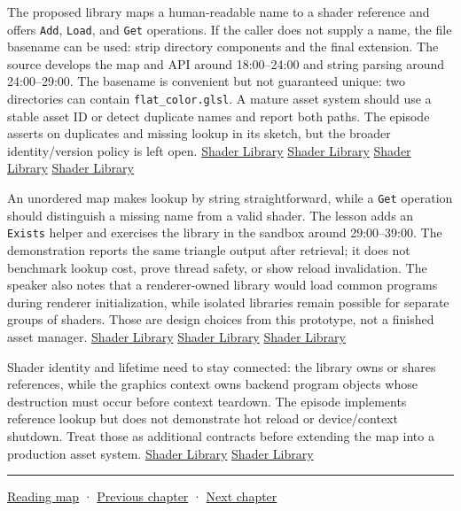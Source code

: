The proposed library maps a human-readable name to a shader reference and offers \texttt{Add}, \texttt{Load}, and \texttt{Get} operations. If the caller does not supply a name, the file basename can be used: strip directory components and the final extension. The source develops the map and API around 18:00--24:00 and string parsing around 24:00--29:00. The basename is convenient but not guaranteed unique: two directories can contain \texttt{flat\_color.glsl}. A mature asset system should use a stable asset ID or detect duplicate names and report both paths. The episode asserts on duplicates and missing lookup in its sketch, but the broader identity/version policy is left open. \href{https://www.youtube.com/watch?v=Z9LE3ksHEQQ&t=1080s}{Shader Library} \href{https://www.youtube.com/watch?v=Z9LE3ksHEQQ&t=1320s}{Shader Library} \href{https://www.youtube.com/watch?v=Z9LE3ksHEQQ&t=1500s}{Shader Library} \href{https://www.youtube.com/watch?v=Z9LE3ksHEQQ&t=1680s}{Shader Library}

An unordered map makes lookup by string straightforward, while a \texttt{Get} operation should distinguish a missing name from a valid shader. The lesson adds an \texttt{Exists} helper and exercises the library in the sandbox around 29:00--39:00. The demonstration reports the same triangle output after retrieval; it does not benchmark lookup cost, prove thread safety, or show reload invalidation. The speaker also notes that a renderer-owned library would load common programs during renderer initialization, while isolated libraries remain possible for separate groups of shaders. Those are design choices from this prototype, not a finished asset manager. \href{https://www.youtube.com/watch?v=Z9LE3ksHEQQ&t=1740s}{Shader Library} \href{https://www.youtube.com/watch?v=Z9LE3ksHEQQ&t=2040s}{Shader Library} \href{https://www.youtube.com/watch?v=Z9LE3ksHEQQ&t=2220s}{Shader Library}

Shader identity and lifetime need to stay connected: the library owns or shares references, while the graphics context owns backend program objects whose destruction must occur before context teardown. The episode implements reference lookup but does not demonstrate hot reload or device/context shutdown. Treat those as additional contracts before extending the map into a production asset system. \href{https://www.youtube.com/watch?v=Z9LE3ksHEQQ&t=2400s}{Shader Library} \href{https://www.youtube.com/watch?v=Z9LE3ksHEQQ&t=2460s}{Shader Library}

\begin{center}\rule{0.5\linewidth}{0.5pt}\end{center}

\hyperref[volume-reading-map]{Reading map} · \hyperref[05-engine-i-ch024-profiling-and-languageplatform-ownership]{Previous chapter} · \hyperref[06-engine-ii-ch026-descriptor-arrays-and-backend-limits]{Next chapter}

